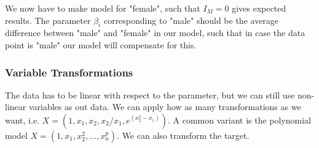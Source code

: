 \documentclass{article}
\begin{document}
We now have to make model for "female", such that $I_M = 0$ gives expected results. The parameter $\beta_i$ corresponding to "male" should be the average difference between "male" and "female" in our model, such that in case the data point is "male" our model will compensate for this. 

\subsubsection{Variable Transformations}
The data has to be linear with respect to the parameter, but we can still use non-linear variables as out data. We can apply how as many transformations as we want, i.e. $X = (1, x_1, x_2, x_2/x_1, e^{(x_2^2 - x_1)})$. A common variant is the polynomial model $X = (1, x_1, x_2^2 , ... , x_n^p)$. We can also transform the target.
\end{document}
